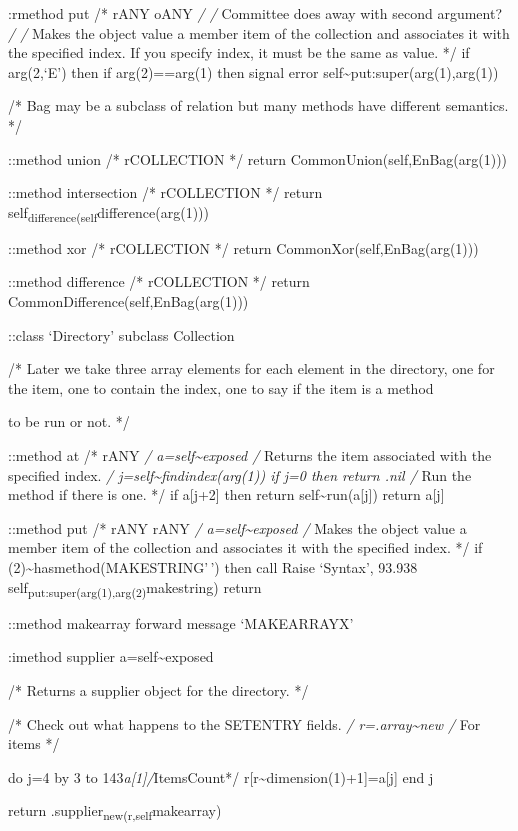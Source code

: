 :rmethod put /* rANY oANY \emph{/ /} Committee does away with second
argument? \emph{/ /} Makes the object value a member item of the
collection and associates it with the specified index. If you specify
index, it must be the same as value. */ if arg(2,`E') then if
arg(2)==arg(1) then signal error
self\textasciitilde put:super(arg(1),arg(1))

/* Bag may be a subclass of relation but many methods have different
semantics. */

::method union /* rCOLLECTION */ return CommonUnion(self,EnBag(arg(1)))

::method intersection /* rCOLLECTION */ return
self\textsubscript{difference(self}difference(arg(1)))

::method xor /* rCOLLECTION */ return CommonXor(self,EnBag(arg(1)))

::method difference /* rCOLLECTION */ return
CommonDifference(self,EnBag(arg(1)))

::class `Directory' subclass Collection

/* Later we take three array elements for each element in the directory,
one for the item, one to contain the index, one to say if the item is a
method

to be run or not. */

::method at /* rANY \emph{/ a=self\textasciitilde exposed /} Returns the
item associated with the specified index. \emph{/
j=self\textasciitilde findindex(arg(1)) if j=0 then return .nil /} Run
the method if there is one. */ if a{[}j+2{]} then return
self\textasciitilde run(a{[}j{]}) return a{[}j{]}

::method put /* rANY rANY \emph{/ a=self\textasciitilde exposed /} Makes
the object value a member item of the collection and associates it with
the specified index. */ if
\arg(2)\textasciitilde hasmethod(MAKESTRING'\,') then call Raise
`Syntax', 93.938 self\textsubscript{put:super(arg(1),arg(2)}makestring)
return

::method makearray forward message `MAKEARRAYX'

:imethod supplier a=self\textasciitilde exposed

/* Returns a supplier object for the directory. */

/* Check out what happens to the SETENTRY fields. \emph{/
r=.array\textasciitilde new /} For items */

do j=4 by 3 to 143\emph{a{[}1{]}/}ItemsCount*/
r{[}r\textasciitilde dimension(1)+1{]}=a{[}j{]} end j

return .supplier\textsubscript{new(r,self}makearray)

